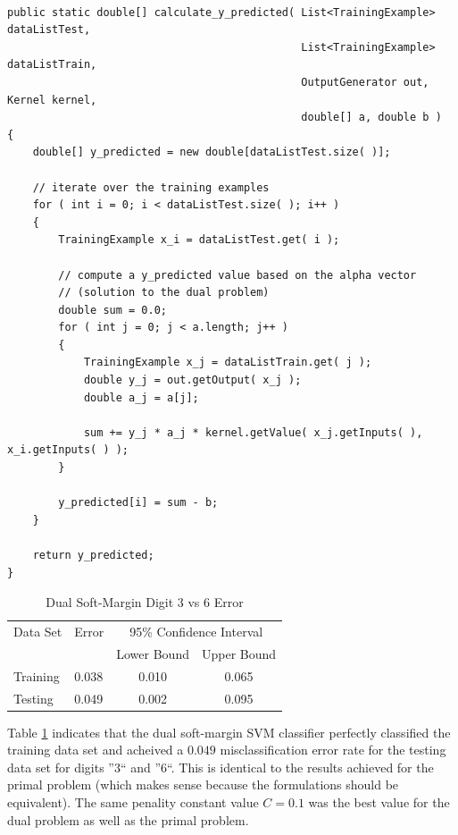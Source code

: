 \documentclass{article}
\begin{document}
\begin{samepage}
\begin{verbatim}

public static double[] calculate_y_predicted( List<TrainingExample> dataListTest,
                                              List<TrainingExample> dataListTrain,
                                              OutputGenerator out, Kernel kernel,
                                              double[] a, double b )
{
    double[] y_predicted = new double[dataListTest.size( )];

    // iterate over the training examples
    for ( int i = 0; i < dataListTest.size( ); i++ )
    {
        TrainingExample x_i = dataListTest.get( i );

        // compute a y_predicted value based on the alpha vector
        // (solution to the dual problem)
        double sum = 0.0;
        for ( int j = 0; j < a.length; j++ )
        {
            TrainingExample x_j = dataListTrain.get( j );
            double y_j = out.getOutput( x_j );
            double a_j = a[j];

            sum += y_j * a_j * kernel.getValue( x_j.getInputs( ), x_i.getInputs( ) );
        }

        y_predicted[i] = sum - b;
    }

    return y_predicted;
}

\end{verbatim}
\end{samepage}

\begin{table}\label{table2}
\caption{Dual Soft-Margin Digit 3 vs 6 Error}
\begin{center}
\begin{tabular}{llcc}
\toprule
Data Set & Error & \multicolumn{2}{c}{95\% Confidence Interval} \\
\cmidrule(r){3-4}
& & Lower Bound & Upper Bound \\
\midrule
Training & 0.038 & 0.010 & 0.065 \\
Testing & 0.049 & 0.002 & 0.095 \\
\bottomrule
\end{tabular}
\end{center}
\end{table}

Table \ref{table2} indicates that the dual soft-margin SVM classifier perfectly classified the training data set and acheived a \(0.049\) misclassification error rate for the testing data set for digits ''3`` and ''6``. This is identical to the results achieved for the primal problem (which makes sense because the formulations should be equivalent). The same penality constant value \(C=0.1\) was the best value for the dual problem as well as the primal problem.
\end{document}
